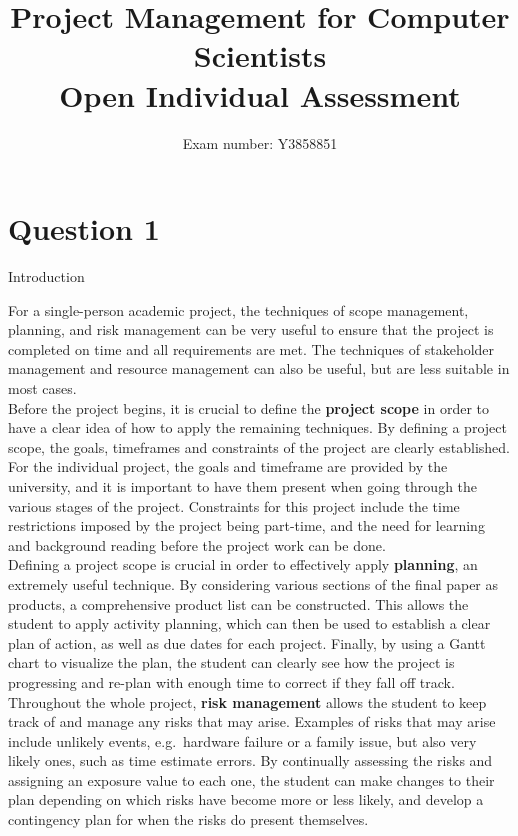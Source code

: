 \documentclass[12pt]{report}
\begin{document}
\author{Exam number: Y3858851}
\title{Project Management for Computer Scientists \\ {\large Open Individual Assessment}}
\date{}
\maketitle
\section*{Question 1} 

Introduction

For a single-person academic project, the techniques of scope management, planning, and risk management can be very useful to ensure that the project is completed on time and all requirements are met. The techniques of stakeholder management and resource management can also be useful, but are less suitable in most cases.\\ 

Before the project begins, it is crucial to define the \textbf{project scope} in order to have a clear idea of how to apply the remaining techniques. By defining a project scope, the goals, timeframes and constraints of the project are clearly established. For the individual project, the goals and timeframe are provided by the university, and it is important to have them present when going through the various stages of the project. Constraints for this project include the time restrictions imposed by the project being part-time, and the need for learning and background reading before the project work can be done.\\

Defining a project scope is crucial in order to effectively apply \textbf{planning}, an extremely useful technique. By considering various sections of the final paper as products, a comprehensive product list can be constructed. This allows the student to apply activity planning, which can then be used to establish a clear plan of action, as well as due dates for each project. Finally, by using a Gantt chart to visualize the plan, the student can clearly see how the project is progressing and re-plan with enough time to correct if they fall off track.\\

Throughout the whole project, \textbf{risk management} allows the student to keep track of and manage any risks that may arise. Examples of risks that may arise include unlikely events, e.g.\ hardware failure or a family issue, but also very likely ones, such as time estimate errors\cite{estimates}. By continually assessing the risks and assigning an exposure value to each one, the student can make changes to their plan depending on which risks have become more or less likely, and develop a contingency plan for when the risks do present themselves.\\
\end{document}
